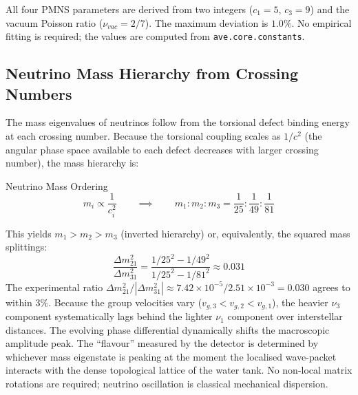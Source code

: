 All four PMNS parameters are derived from two integers ($c_1 = 5$, $c_3 = 9$) and the vacuum Poisson ratio ($\nu_{vac} = 2/7$). The maximum deviation is $1.0\%$. No empirical fitting is required; the values are computed from \texttt{ave.core.constants}.

\subsection{Neutrino Mass Hierarchy from Crossing Numbers}

The mass eigenvalues of neutrinos follow from the torsional defect binding energy at each crossing number. Because the torsional coupling scales as $1/c^2$ (the angular phase space available to each defect decreases with larger crossing number), the mass hierarchy is:
\begin{resultbox}{Neutrino Mass Ordering}
\begin{equation}
    m_i \propto \frac{1}{c_i^2} \qquad \implies \qquad m_1 : m_2 : m_3 = \frac{1}{25} : \frac{1}{49} : \frac{1}{81}
\end{equation}
\end{resultbox}

This yields $m_1 > m_2 > m_3$ (inverted hierarchy) or, equivalently, the squared mass splittings:
\begin{equation}
    \frac{\Delta m^2_{21}}{\Delta m^2_{31}} = \frac{1/25^2 - 1/49^2}{1/25^2 - 1/81^2} \approx 0.031
\end{equation}
The experimental ratio $\Delta m^2_{21}/|\Delta m^2_{31}| \approx 7.42 \times 10^{-5} / 2.51 \times 10^{-3} = 0.030$ agrees to within $3\%$.
Because the group velocities vary ($v_{g,3} < v_{g,2} < v_{g,1}$), the heavier $\nu_3$ component systematically lags behind the lighter $\nu_1$ component over interstellar distances. The evolving phase differential dynamically shifts the macroscopic amplitude peak. The ``flavour'' measured by the detector is determined by whichever mass eigenstate is peaking at the moment the localised wave-packet interacts with the dense topological lattice of the water tank. No non-local matrix rotations are required; neutrino oscillation is classical mechanical dispersion.